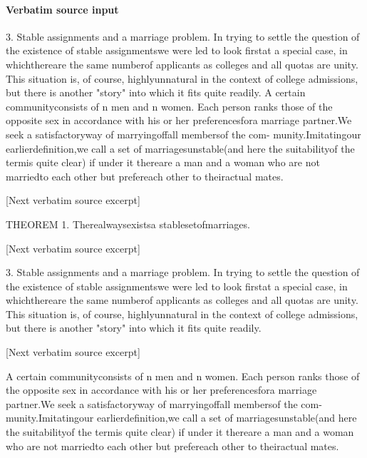 \documentclass[10pt]{article}
\begin{document}
\paragraph{Verbatim source input}
\begin{ReviewVerbatim}
3. Stable assignments and a marriage problem. In trying to settle the
question of the existence of stable assignmentswe were led to look firstat a
special case, in whichthereare the same numberof applicants as colleges and all
quotas are unity. This situation is, of course, highlyunnatural in the context
of college admissions, but there is another "story" into which it fits quite
readily.
   A certain communityconsists of n men and n women. Each person ranks
those of the opposite sex in accordance with his or her preferencesfora marriage
partner.We seek a satisfactoryway of marryingoffall membersof the com-
munity.Imitatingour earlierdefinition,we call a set of marriagesunstable(and
here the suitabilityof the termis quite clear) if under it thereare a man and a
woman who are not marriedto each other but prefereach other to theiractual
mates.

[Next verbatim source excerpt]

     THEOREM 1. Therealwaysexistsa stablesetofmarriages.

[Next verbatim source excerpt]

   3. Stable assignments and a marriage problem. In trying to settle the
question of the existence of stable assignmentswe were led to look firstat a
special case, in whichthereare the same numberof applicants as colleges and all
quotas are unity. This situation is, of course, highlyunnatural in the context
of college admissions, but there is another "story" into which it fits quite
readily.

[Next verbatim source excerpt]

   A certain communityconsists of n men and n women. Each person ranks
those of the opposite sex in accordance with his or her preferencesfora marriage
partner.We seek a satisfactoryway of marryingoffall membersof the com-
munity.Imitatingour earlierdefinition,we call a set of marriagesunstable(and
here the suitabilityof the termis quite clear) if under it thereare a man and a
woman who are not marriedto each other but prefereach other to theiractual
mates.
\end{ReviewVerbatim}
\end{document}
